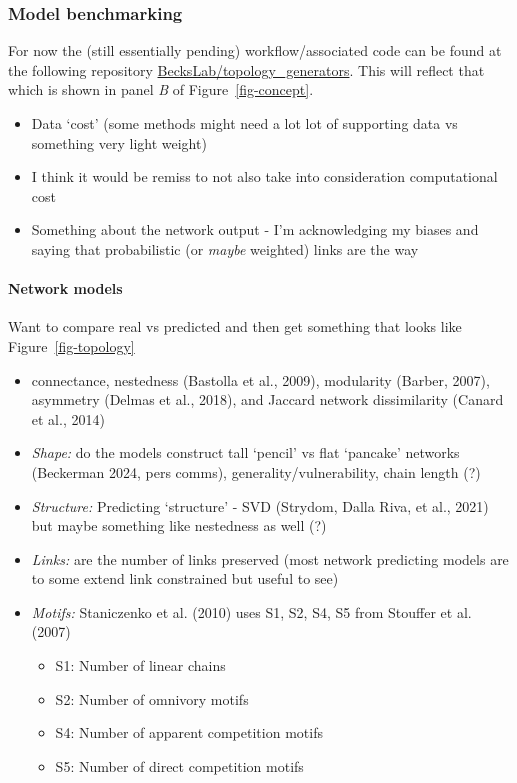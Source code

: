 \documentclass[
]{agujournal2019}
\let\oldparagraph\paragraph
\renewcommand{\paragraph}[1]{\oldparagraph{#1}\mbox{}}
\providecommand{\tightlist}{%
  \setlength{\itemsep}{0pt}\setlength{\parskip}{0pt}}\usepackage{longtable,booktabs,array}
\begin{document}
\subsubsection{Model benchmarking}\label{sec-model-benchmarking}

For now the (still essentially pending) workflow/associated code can be
found at the following repository
\href{https://github.com/BecksLab/topology_generators}{BecksLab/topology\_generators}.
This will reflect that which is shown in panel \emph{B} of
Figure~\ref{fig-concept}.

\begin{itemize}
\tightlist
\item
  Data `cost' (some methods might need a lot lot of supporting data vs
  something very light weight)
\item
  I think it would be remiss to not also take into consideration
  computational cost
\item
  Something about the network output - I'm acknowledging my biases and
  saying that probabilistic (or \emph{maybe} weighted) links are the way
\end{itemize}

\paragraph{Network models}\label{network-models}

Want to compare real vs predicted and then get something that looks like
Figure~\ref{fig-topology}

\begin{itemize}
\item
  connectance, nestedness (Bastolla et al., 2009), modularity (Barber,
  2007), asymmetry (Delmas et al., 2018), and Jaccard network
  dissimilarity (Canard et al., 2014)
\item
  \emph{Shape:} do the models construct tall `pencil' vs flat `pancake'
  networks (Beckerman 2024, pers comms), generality/vulnerability, chain
  length (?)
\item
  \emph{Structure:} Predicting `structure' - SVD (Strydom, Dalla Riva,
  et al., 2021) but maybe something like nestedness as well (?)
\item
  \emph{Links:} are the number of links preserved (most network
  predicting models are to some extend link constrained but useful to
  see)
\item
  \emph{Motifs:} Staniczenko et al. (2010) uses S1, S2, S4, S5 from
  Stouffer et al. (2007)

  \begin{itemize}
  \item
    S1: Number of linear chains
  \item
    S2: Number of omnivory motifs
  \item
    S4: Number of apparent competition motifs
  \item
    S5: Number of direct competition motifs
  \end{itemize}
\end{itemize}
\end{document}
